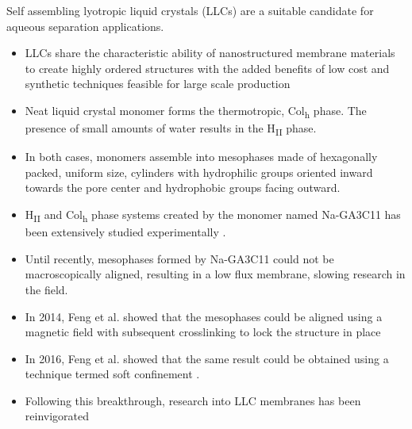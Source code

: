 \documentclass{article}
\begin{document}
  Self assembling lyotropic liquid crystals (LLCs) are a suitable candidate for
  aqueous separation applications. 
  \begin{itemize}
    \item LLCs share the characteristic ability of nanostructured membrane
    materials to create highly ordered structures with the added benefits
    of low cost and synthetic techniques feasible for 
    large scale production \cite{feng_scalable_2014}
    \item Neat liquid crystal monomer forms the thermotropic, Col\textsubscript{h}
    phase. The presence of small amounts of water results in the H\textsubscript{II} 
    phase.
    \item In both cases, monomers assemble into mesophases made of hexagonally
    packed, uniform size, cylinders with hydrophilic groups oriented inward
    towards the pore center and hydrophobic groups facing outward.
    \item H\textsubscript{II} and Col\textsubscript{h} phase systems created by
    the monomer named Na-GA3C11 has been extensively studied experimentally \cite{smith_ordered_1997, %
    zhou_supported_2005,resel_h2-phase_2000,feng_scalable_2014,feng_thin_2016}. 
    \item Until recently, mesophases formed by Na-GA3C11 could not be macroscopically
    aligned, resulting in a low flux membrane, slowing research in the field.
    \item In 2014, Feng et al. showed that the mesophases could be aligned 
    using a magnetic field with subsequent crosslinking to lock the structure
    in place \cite{feng_scalable_2014}
    \item In 2016, Feng et al. showed that the same result could be obtained 
    using a technique termed soft confinement \cite{feng_thin_2016}.
    \item Following this breakthrough, research into LLC membranes has been
    reinvigorated
  \end{itemize}
 
\end{document}
